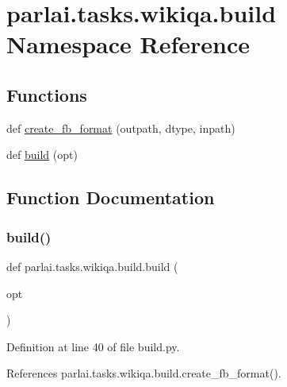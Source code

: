 \hypertarget{namespaceparlai_1_1tasks_1_1wikiqa_1_1build}{}\section{parlai.\+tasks.\+wikiqa.\+build Namespace Reference}
\label{namespaceparlai_1_1tasks_1_1wikiqa_1_1build}
\subsection*{Functions}
\begin{DoxyCompactItemize}
\item 
def \hyperlink{namespaceparlai_1_1tasks_1_1wikiqa_1_1build_a554828702769592403db58c955d1dfe3}{create\+\_\+fb\+\_\+format} (outpath, dtype, inpath)
\item 
def \hyperlink{namespaceparlai_1_1tasks_1_1wikiqa_1_1build_a76f8aa9733d147ed1b5f2ec73a2bde07}{build} (opt)
\end{DoxyCompactItemize}


\subsection{Function Documentation}
\mbox{\label{namespaceparlai_1_1tasks_1_1wikiqa_1_1build_a76f8aa9733d147ed1b5f2ec73a2bde07}} 
\subsubsection{\texorpdfstring{build()}{build()}}
{\footnotesize\ttfamily def parlai.\+tasks.\+wikiqa.\+build.\+build (\begin{DoxyParamCaption}\item[{}]{opt }\end{DoxyParamCaption})}



Definition at line 40 of file build.\+py.



References parlai.\+tasks.\+wikiqa.\+build.\+create\+\_\+fb\+\_\+format().

